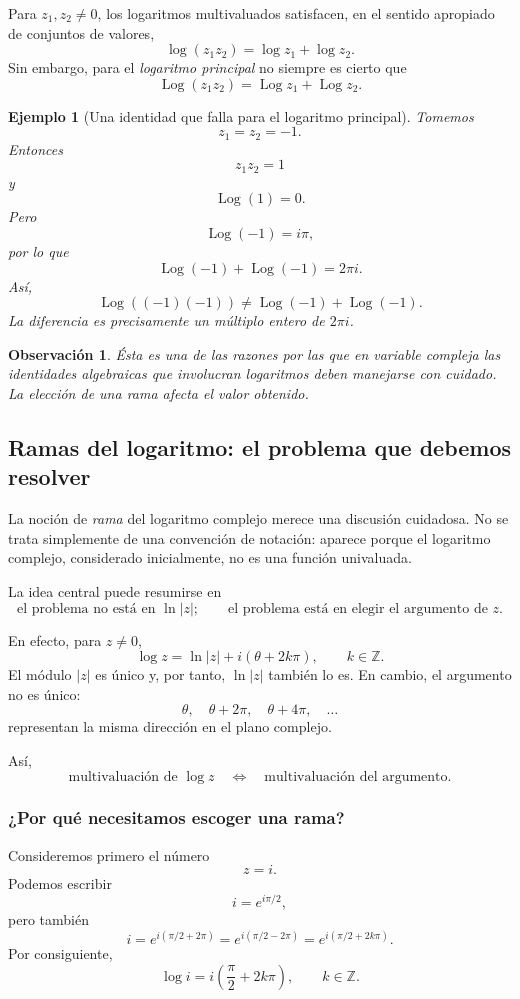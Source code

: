 \documentclass[12pt]{article}
\newtheorem{ejemplo}{Ejemplo}[section]
\newtheorem{Obs}{Observaci\'on}[section]
\newcounter{problema}
\begin{document}
Para $z_1,z_2\neq0$, los logaritmos multivaluados satisfacen, en el sentido
apropiado de conjuntos de valores,
\[
\log(z_1z_2)=\log z_1+\log z_2.
\]
Sin embargo, para el \emph{logaritmo principal} no siempre es cierto que
\[
\operatorname{Log}(z_1z_2)
=
\operatorname{Log}z_1+\operatorname{Log}z_2.
\]

\begin{ejemplo}[Una identidad que falla para el logaritmo principal]
Tomemos
\[
z_1=z_2=-1.
\]
Entonces
\[
z_1z_2=1
\]
y
\[
\operatorname{Log}(1)=0.
\]
Pero
\[
\operatorname{Log}(-1)=i\pi,
\]
por lo que
\[
\operatorname{Log}(-1)+\operatorname{Log}(-1)
=2\pi i.
\]
Así,
\[
\boxed{
\operatorname{Log}((-1)(-1))
\neq
\operatorname{Log}(-1)+\operatorname{Log}(-1).
}
\]
La diferencia es precisamente un múltiplo entero de $2\pi i$.
\end{ejemplo}

\begin{Obs}
Ésta es una de las razones por las que en variable compleja las identidades
algebraicas que involucran logaritmos deben manejarse con cuidado. La elección
de una rama afecta el valor obtenido.
\end{Obs}

\subsection*{Ramas del logaritmo: el problema que debemos resolver}
La noción de \emph{rama} del logaritmo complejo merece una discusión cuidadosa.
No se trata simplemente de una convención de notación: aparece porque el
logaritmo complejo, considerado inicialmente, no es una función univaluada.

La idea central puede resumirse en
\[
\boxed{
\text{el problema no está en }\ln|z|;
\qquad
\text{el problema está en elegir el argumento de }z.
}
\]

En efecto, para $z\neq0$,
\[
\log z=\ln|z|+i(\theta+2k\pi),\qquad k\in\mathbb Z.
\]
El módulo $|z|$ es único y, por tanto, $\ln|z|$ también lo es. En cambio,
el argumento no es único:
\[
\theta,\quad\theta+2\pi,\quad\theta+4\pi,\quad\ldots
\]
representan la misma dirección en el plano complejo.

Así,
\[
\boxed{
\text{multivaluación de }\log z
\quad\Longleftrightarrow\quad
\text{multivaluación del argumento}.
}
\]
\subsubsection*{¿Por qué necesitamos escoger una rama?}
Consideremos primero el número
\[
z=i.
\]
Podemos escribir
\[
i=e^{i\pi/2},
\]
pero también
\[
i=e^{i(\pi/2+2\pi)}
=e^{i(\pi/2-2\pi)}
=e^{i(\pi/2+2k\pi)}.
\]
Por consiguiente,
\[
\log i
=
i\left(\frac{\pi}{2}+2k\pi\right),
\qquad k\in\mathbb Z.
\]
\end{document}
